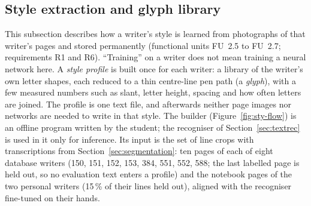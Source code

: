 
\subsection{Style extraction and glyph library}
\label{sec:styleprofile}

This subsection describes how a writer's style is learned from photographs of that writer's pages and stored permanently (functional units FU~2.5 to FU~2.7; requirements R1 and R6).
``Training'' on a writer does not mean training a neural network here.
A \emph{style profile} is built once for each writer: a library of the writer's own letter shapes, each reduced to a thin centre-line pen path (a \emph{glyph}), with a few measured numbers such as slant, letter height, spacing and how often letters are joined.
The profile is one text file, and afterwards neither page images nor networks are needed to write in that style.
The builder (Figure~\ref{fig:sty-flow}) is an offline program written by the student; the recogniser of Section~\ref{sec:textrec} is used in it only for inference.
Its input is the set of line crops with transcriptions from Section~\ref{sec:segmentation}: ten pages of each of eight database writers (150, 151, 152, 153, 384, 551, 552, 588; the last labelled page is held out, so no evaluation text enters a profile) and the notebook pages of the two personal writers (15\,\% of their lines held out), aligned with the recogniser fine-tuned on their hands.

